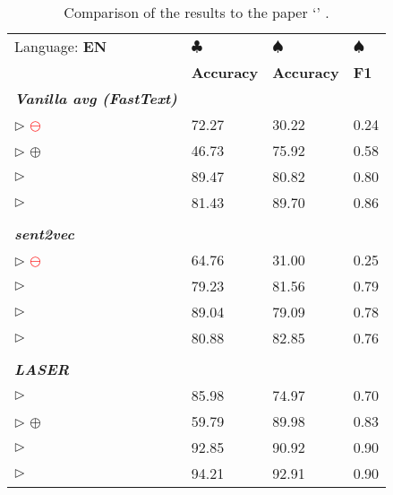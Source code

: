 \begin{table}[h]
	\centering
	\renewcommand{\arraystretch}{1.1}
	\begin{tabularx}{\textwidth}{| X Y | Y Y |}
		\hline
		Language: \textbf{EN}										&
		\textbf{$\clubsuit$} 											&
		\textbf{$\spadesuit$}					 						&
		\textbf{$\spadesuit$}											\\
					 												&
		\textbf{Accuracy} 											&
		\textbf{Accuracy} 											&
		\textbf{F1} 													\\
		\textbf{\textit{Vanilla avg (FastText)}} & & &				 	\\
		\hline
		$\triangleright$  \textcolor{red}{$\ominus$}	
								&	72.27	&	30.22	&	0.24	\\
		$\triangleright$  \textcolor{green!80!black}{$\oplus$} 
								&	46.73	&	75.92	&	0.58	\\
		$\triangleright$ 	
								&	89.47	&	80.82	&	0.80	\\
		$\triangleright$ 
								&	81.43	&	89.70	&	0.86	\\
		& & &														\\
		\textbf{\textit{sent2vec}} & & & 								\\
		\hline
		$\triangleright$  \textcolor{red}{$\ominus$}
								&	64.76	&	31.00	&	0.25	\\
		$\triangleright$  	
								&	79.23	&	81.56	&	0.79	\\
		$\triangleright$ 
								&	89.04	&	79.09	&	0.78	\\
		$\triangleright$ 
								&	80.88	&	82.85	&	0.76	\\
		& & & 														\\
		\textbf{\textit{LASER}} & & & 									\\
		\hline
		$\triangleright$ 
								&	85.98	&	74.97	&	0.70	\\
		$\triangleright$  \textcolor{green!80!black}{$\oplus$}
								&	59.79	&	89.98	&	0.83	\\
		$\triangleright$ 	
								&	92.85	&	90.92	&	0.90	\\
		$\triangleright$ 
								&	94.21	&	92.91	&	0.90	\\
		\hline
	\end{tabularx}
	\caption[Comparison with the results of Krasnowska et al.]
		{Comparison of the results to the paper `'
			\citep{Krasnowska.2019}.}
	\label{tab:comparison_krasnowska}
\end{table}
